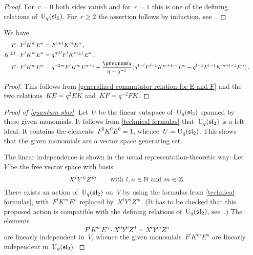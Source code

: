 \documentclass[a4paper, 11pt, oneside]{scrartcl}
\begin{document}
\begin{proof}
  For~$r = 0$ both sides vanish and for~$r = 1$ this is one of the defining relations of~$\operatorname{U}_q(\mathfrak{sl}_2)$.
  For~$r \geq 2$ the assertion follows by induction, see~\cite[Appendix 1.3~(5)]{jantzen_quantum}.
\end{proof}

\begin{corollary}
  \label{technical formulas}
  We have
  \begin{align*}
    F \cdot F^l K^m E^n
    &=
    F^{l+1} K^m E^n \,,
    \\
    K^{\pm 1} \cdot F^l K^m E^n
    &=
    q^{\mp 2l} F^l K^{m \pm 1} E^n \,,
    \\
    E \cdot F^l K^m E^n
    &=
    q^{-2m} F^l K^m E^{n+1}
    +
    \frac{\qnum{l}}{q - q^{-1}}
    (
      q^{1-l} F^{l-1} K^{m + 1-l} E^n
      -
      q^{l-1} F^{l-1} K^{m + l-1} E^n
    ) \,.
  \end{align*}
\end{corollary}

\begin{proof}
  This follows from \cref{generalized commutator relation for E and F} and the two relations~$KE = q^2 EK$ and~$KF = q^{-2} FK$.
\end{proof}

\begin{proof}[Proof of \cref{quantum pbw}]
  Let~$U$ be the linear subspace of~$\operatorname{U}_q(\mathfrak{sl}_2)$ spanned by these given monomials. 
  It follows from \cref{technical formulas} that~$\operatorname{U}_q(\mathfrak{sl}_2)$ is a left ideal.
  It contains the elements~$F^0 K^0 E^0 = 1$, whence~$U = \operatorname{U}_q(\mathfrak{sl}_2)$.
  This shows that the given monomials are a vector space generating set.

  The linear independence is shown in the usual representation-theoretic way:
  Let~$V$ be the free vector space with basis
  \[
    X^l Y^n Z^m
    \qquad
    \text{with~$l, n \in \mathbb{N}$ and~$m \in \mathbb{Z}$}.
  \]
  There exists an action of~$\operatorname{U}_q(\mathfrak{sl}_2)$ on~$V$ by using the formulas from \cref{technical formulas}, with~$F^l K^m E^n$ replaced by~$X^l Y^n Z^m$.
  (It has to be checked that this proposed action is compatible with the defining relations of~$\operatorname{U}_q(\mathfrak{sl}_2)$, see~\cite[Appendix 1.5]{jantzen_quantum}.)
  The elements
  \[
    F^l K^m E^n \cdot X^0 Y^0 Z^0
    =
    X^l Y^m Z^n
  \]
  are linearly independent in~$V$, whence the given monomials~$F^l K^m E^n$ are linearly independent in~$\operatorname{U}_q(\mathfrak{sl}_2)$.
\end{proof}
\end{document}
